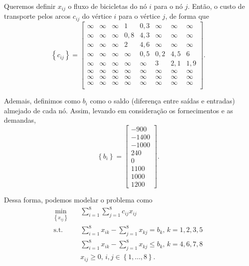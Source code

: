 \documentclass[a4paper]{report}
\begin{document}

Queremos definir $x_{ij}$ o fluxo de bicicletas do nó $i$ para o nó $j$. Então, o custo de transporte pelos arcos $c_{ij}$ do vértice $i$ para o vértice $j$, de forma que \[
\left\{ c_{ij} \right\} = \begin{bmatrix} 
    \infty & \infty & \infty & 1 & 0,3 & \infty & \infty & \infty \\
    \infty & \infty & \infty & 0,8 & 4,3 & \infty & \infty  & \infty \\
    \infty & \infty & \infty & 2 & 4,6 & \infty & \infty & \infty   \\
    \infty & \infty & \infty & \infty & 0,5 & 0,2 & 4,5 & 6   \\
    \infty & \infty & \infty & \infty & \infty & 3 & 2,1 & 1,9 \\
    \infty & \infty & \infty & \infty & \infty & \infty & \infty & \infty \\
    \infty & \infty & \infty & \infty & \infty & \infty & \infty & \infty \\
    \infty & \infty & \infty & \infty & \infty & \infty & \infty & \infty \\
\end{bmatrix} 
.\] 

Ademais, definimos como $b_i$ como o saldo (diferença entre saídas e entradas) almejado de cada nó. Assim, levando em consideração os fornecimentos e as demandas, \[
\left\{ b_i \right\} = \begin{bmatrix} 
    -900 \\
    -1400 \\
    -1000 \\
    240 \\
    0 \\
    1100 \\
    1000 \\
    1200
\end{bmatrix} 
.\]

Dessa forma, podemos modelar o problema como
\begin{align*}
    \min_{\left\{ x_{ij} \right\} } \quad & \sum_{i=1}^{8} \sum_{j=1}^{8} c_{ij}x_{ij} \\
    \textrm{s.t.} \quad & \sum_{i=1}^{8} x_{ik} - \sum_{j=1}^{8} x_{kj} = b_k,\, k=1,2,3,5 \\
      & \sum_{i=1}^{8} x_{ik} - \sum_{j=1}^{8} x_{kj} \le  b_k,\, k=4,6,7,8 \\
      & x_{ij} \ge 0,\, i,j \in \left\{ 1,\ldots,8 \right\} 
.\end{align*}
\end{document}
